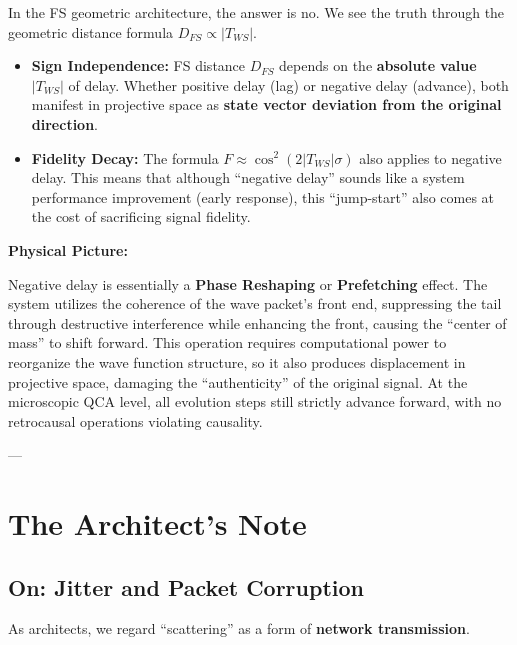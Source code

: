 In the FS geometric architecture, the answer is no. We see the truth through the geometric distance formula $D_{FS} \propto |T_{WS}|$.

\begin{itemize}
\item \textbf{Sign Independence:} FS distance $D_{FS}$ depends on the \textbf{absolute value} $|T_{WS}|$ of delay. Whether positive delay (lag) or negative delay (advance), both manifest in projective space as \textbf{state vector deviation from the original direction}.

\item \textbf{Fidelity Decay:} The formula $F \approx \cos^2(2 |T_{WS}| \sigma)$ also applies to negative delay. This means that although ``negative delay'' sounds like a system performance improvement (early response), this ``jump-start'' also comes at the cost of sacrificing signal fidelity.
\end{itemize}

\textbf{Physical Picture:}

Negative delay is essentially a \textbf{Phase Reshaping} or \textbf{Prefetching} effect. The system utilizes the coherence of the wave packet's front end, suppressing the tail through destructive interference while enhancing the front, causing the ``center of mass'' to shift forward. This operation requires computational power to reorganize the wave function structure, so it also produces displacement in projective space, damaging the ``authenticity'' of the original signal. At the microscopic QCA level, all evolution steps still strictly advance forward, with no retrocausal operations violating causality.

---

\section{The Architect's Note}

\subsection{On: Jitter and Packet Corruption}

As architects, we regard ``scattering'' as a form of \textbf{network transmission}.

